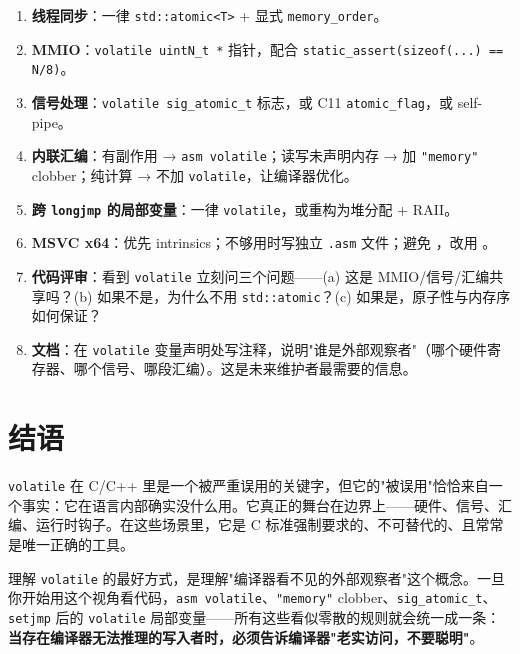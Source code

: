 \documentclass[12pt,a4paper,fontset=fandol]{ctexbook}
\newcommand{\cpp}[1]{C++#1}
\newcommand{\kw}[1]{\texttt{#1}}
\begin{document}
\begin{enumerate}[nosep]
  \item \textbf{线程同步}：一律 \texttt{std::atomic<T>} + 显式 \texttt{memory\_order}。
  \item \textbf{MMIO}：\texttt{volatile uintN\_t *} 指针，配合 \texttt{static\_assert(sizeof(...) == N/8)}。
  \item \textbf{信号处理}：\texttt{volatile sig\_atomic\_t} 标志，或 C11 \texttt{atomic\_flag}，或 self-pipe。
  \item \textbf{内联汇编}：有副作用 → \texttt{asm volatile}；读写未声明内存 → 加 \texttt{"memory"} clobber；纯计算 → 不加 \kw{volatile}，让编译器优化。
  \item \textbf{跨 \texttt{longjmp} 的局部变量}：一律 \kw{volatile}，或重构为堆分配 + RAII。
  \item \textbf{MSVC x64}：优先 intrinsics；不够用时写独立 \texttt{.asm} 文件；避免 ，改用 。
  \item \textbf{代码评审}：看到 \kw{volatile} 立刻问三个问题——(a) 这是 MMIO/信号/汇编共享吗？(b) 如果不是，为什么不用 \texttt{std::atomic}？(c) 如果是，原子性与内存序如何保证？
  \item \textbf{文档}：在 \kw{volatile} 变量声明处写注释，说明"谁是外部观察者"（哪个硬件寄存器、哪个信号、哪段汇编）。这是未来维护者最需要的信息。
\end{enumerate}

\section{结语}\label{sec:conclusion}

\kw{volatile} 在 C/\allowbreak{}\cpp{} 里是一个被严重误用的关键字，但它的"被误用"恰恰来自一个事实：它在语言内部确实没什么用。它真正的舞台在边界上——硬件、信号、汇编、运行时钩子。在这些场景里，它是 C 标准强制要求的、不可替代的、且常常是唯一正确的工具。

理解 \kw{volatile} 的最好方式，是理解"编译器看不见的外部观察者"这个概念。一旦你开始用这个视角看代码，\texttt{asm volatile}、\texttt{"memory"} clobber、\texttt{sig\_atomic\_t}、\texttt{setjmp} 后的 \kw{volatile} 局部变量——所有这些看似零散的规则就会统一成一条：\textbf{当存在编译器无法推理的写入者时，必须告诉编译器"老实访问，不要聪明"}。
\end{document}
